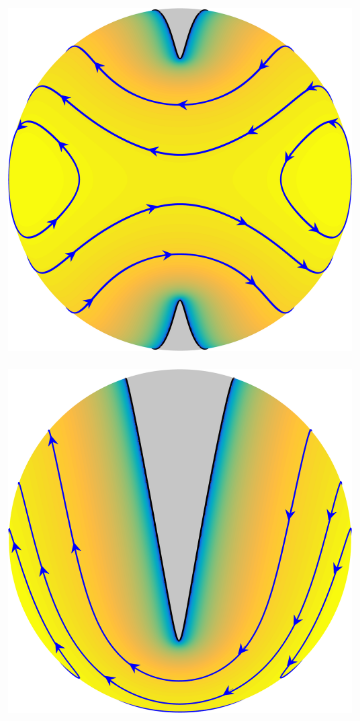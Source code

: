 \documentclass{sfuthesis}
\begin{document}
\begin{figure}[h]
\begin{subfigure}[b]{0.3\textwidth}
       		\includegraphics[width=\textwidth]{Ex6-8LongIslandBottomView}
   	\end{subfigure}\hspace{0.3cm}
        \begin{subfigure}[b]{0.3\textwidth}
       		\includegraphics[width=\textwidth]{Ex6-8LongIslandFrontView}

\end{subfigure}
\end{figure}
\end{document}
